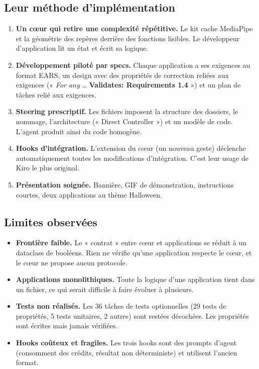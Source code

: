 \subsection{Leur méthode d'implémentation}

\begin{enumerate}[leftmargin=1.2em]
  \item \textbf{Un cœur qui retire une complexité répétitive.} Le kit cache MediaPipe et la géométrie des repères derrière des fonctions  lisibles. Le développeur d'application lit un état et écrit sa logique.
  \item \textbf{Développement piloté par specs.} Chaque application a ses exigences au format EARS, un design avec des propriétés de correction reliées aux exigences (« \emph{For any} \dots{} \textbf{Validates: Requirements 1.4} ») et un plan de tâches relié aux exigences.
  \item \textbf{Steering prescriptif.} Les fichiers imposent la structure des dossiers, le nommage, l'architecture (« Direct Controller ») et un modèle de code. L'agent produit ainsi du code homogène.
  \item \textbf{Hooks d'intégration.} L'extension du cœur (un nouveau geste) déclenche automatiquement toutes les modifications d'intégration. C'est leur usage de Kiro le plus original.
  \item \textbf{Présentation soignée.} Bannière, GIF de démonstration, instructions courtes, deux applications au thème Halloween.
\end{enumerate}

\subsection{Limites observées}

\begin{itemize}[leftmargin=1.2em]
  \item \textbf{Frontière faible.} Le « contrat » entre cœur et applications se réduit à un dataclass de booléens. Rien ne vérifie qu'une application respecte le cœur, et le cœur ne propose aucun protocole.
  \item \textbf{Applications monolithiques.} Toute la logique d'une application tient dans un fichier, ce qui serait difficile à faire évoluer à plusieurs.
  \item \textbf{Tests non réalisés.} Les 36 tâches de tests optionnelles (29 tests de propriétés, 5 tests unitaires, 2 autres) sont restées décochées. Les propriétés sont écrites mais jamais vérifiées.
  \item \textbf{Hooks coûteux et fragiles.} Les trois hooks sont des prompts d'agent (consomment des crédits, résultat non déterministe) et utilisent l'ancien format.
\end{itemize}

